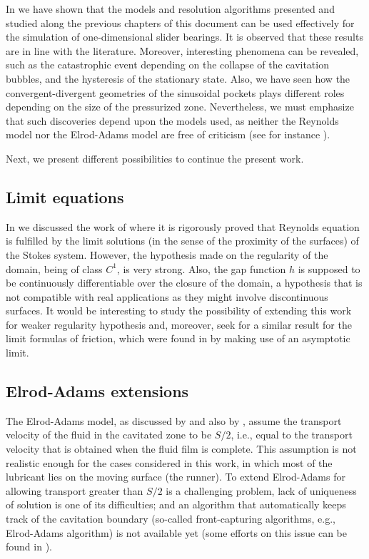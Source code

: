 In  we have shown that the models and resolution algorithms presented and studied along the previous chapters of this document can be used effectively for the simulation of one-dimensional slider bearings. It is observed that these results are in line with the literature. Moreover, interesting phenomena can be revealed, such as the catastrophic event depending on the collapse of the cavitation bubbles, and the hysteresis of the stationary state. Also, we have seen how the convergent-divergent geometries of the sinusoidal pockets plays different roles depending on the size of the pressurized zone. Nevertheless, we must emphasize that such discoveries depend upon the models used, as neither the Reynolds model nor the Elrod-Adams model are free of criticism (see for instance \cite{organisciak2007phd,buscaglia13}).

Next, we present different possibilities to continue the present work.

\subsection*{Limit equations}
In  we discussed the work of \citeauthor{chambat1986} \cite{chambat1986} where it is rigorously proved that Reynolds equation is fulfilled by the limit solutions (in the sense of the proximity of the surfaces) of the Stokes system. However, the hypothesis made on the regularity of the domain, being of class $C^1$, is very strong. Also, the gap function $h$ is supposed to be continuously differentiable over the closure of the domain, a hypothesis that is not compatible with real applications as they might involve discontinuous surfaces. It would be interesting to study the possibility of extending this work for weaker regularity hypothesis and, moreover, seek for a similar result for the limit formulas of friction, which were found in  by making use of an asymptotic limit.

\subsection*{Elrod-Adams extensions}
The Elrod-Adams model, as discussed by \citeauthor{buscaglia13} \cite{buscaglia13} and also by \citeauthor{checophd} \cite{checophd}, assume the transport velocity of the fluid in the cavitated zone to be $S/2$, i.e., equal to the transport velocity that is obtained when the fluid film is complete. This assumption is not realistic enough for the cases considered in this work, in which most of the lubricant lies on the moving surface (the runner). To extend Elrod-Adams for allowing transport greater than $S/2$ is a challenging problem, lack of uniqueness of solution is one of its difficulties; and an algorithm that automatically keeps track of the cavitation boundary (so-called front-capturing algorithms, e.g., Elrod-Adams algorithm) is not available yet (some efforts on this issue can be found in \cite{checophd}).

